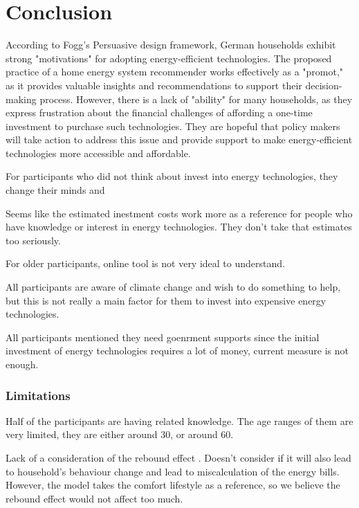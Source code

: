 \chapter{Conclusion}

According to Fogg's Persuasive design framework, 
German households exhibit strong "motivations" for adopting energy-efficient technologies. 
The proposed practice of a home energy system recommender works effectively as a "promot," as it provides valuable insights and recommendations to support their decision-making process. 
However, there is a lack of "ability" for many households, 
as they express frustration about the financial challenges of affording a one-time investment to purchase such technologies. 
They are hopeful that policy makers will take action to address this issue and provide support to make energy-efficient technologies more accessible and affordable.

For participants who did not think about invest into energy technologies,
they change their minds and 

Seems like the estimated inestment costs work more as a reference for people who have knowledge or interest in energy technologies. 
They don't take that estimates too seriously. 

For older participants, online tool is not very ideal to understand. 

All participants are aware of climate change and wish to do something to help, but this is not really a main factor for them to invest into expensive energy technologies. 

All participants mentioned they need goenrment supports since the initial investment of energy technologies requires a lot of money, current measure is not enough. 

\subsection{Limitations}

Half of the participants are having related knowledge. 
The age ranges of them are very limited, they are either around 30, or around 60. 

Lack of a consideration of the rebound effect \cite{Herring2007}. 
Doesn't consider if it will also lead to household's behaviour change and lead to miscalculation of the energy bills. 
However, the model takes the comfort lifestyle as a reference, so we believe the rebound effect would not affect too much. 
